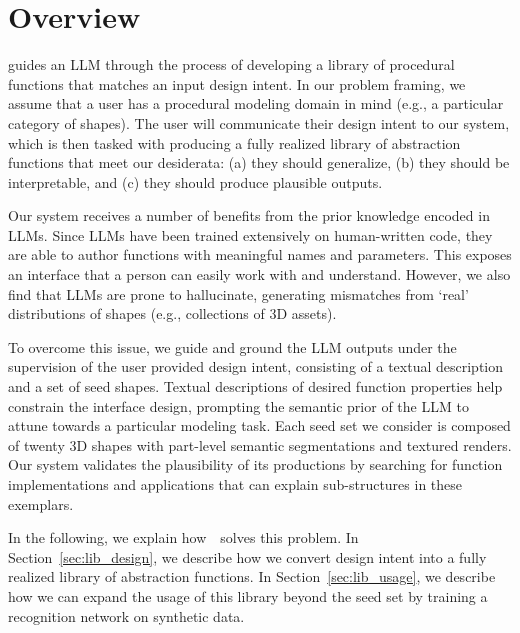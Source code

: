 

\section{Overview}
\label{sec:label}

\methodname guides an LLM through the process of developing a library of procedural functions that matches an input design intent.
In our problem framing, we assume that a user has a procedural modeling domain in mind (e.g., a particular category of shapes).
The user will communicate their design intent to our system, which is then tasked with producing a fully realized library of abstraction functions that meet our desiderata: (a) they should generalize, (b) they should be interpretable, and (c) they should produce plausible outputs. 

Our system receives a number of benefits from the prior knowledge encoded in LLMs.
Since LLMs have been trained extensively on human-written code, they are able to author functions with meaningful names and parameters.
This exposes an interface that a person can easily work with and understand.
However, we also find that LLMs are prone to hallucinate, generating mismatches from `real' distributions of shapes (e.g.,  collections of 3D assets).

To overcome this issue, we guide and ground the LLM outputs under the supervision of the user provided design intent, consisting of a textual description and a set of seed shapes. 
Textual descriptions of desired function properties help constrain the interface design, prompting the semantic prior of the LLM to attune towards a particular modeling task.
Each seed set we consider is composed of twenty 3D shapes with part-level semantic segmentations and textured renders.
Our system validates the plausibility of its productions by searching for function implementations and applications that can explain sub-structures in these exemplars.

In the following, we explain how~\methodname~solves this problem.
In Section~\ref{sec:lib_design}, we describe how we convert design intent into a fully realized library of abstraction functions.
In Section~\ref{sec:lib_usage}, we describe how we can expand the usage of this library beyond the seed set by training a recognition network on synthetic data. 
